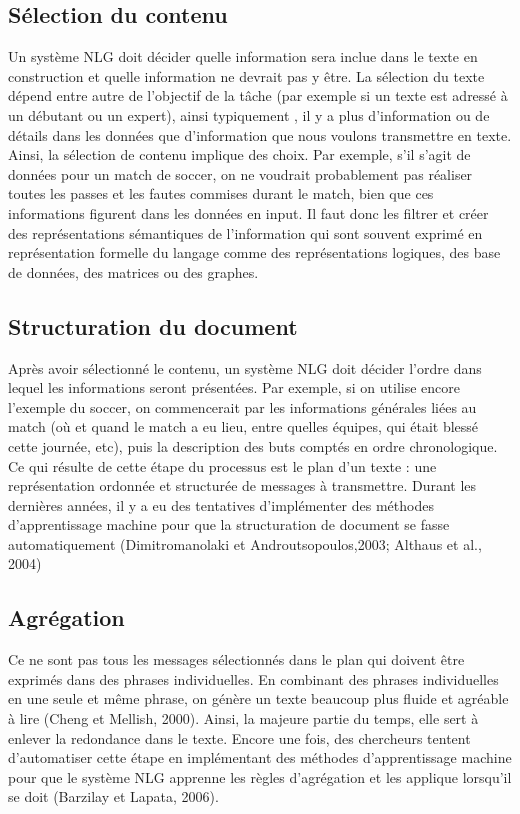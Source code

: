 \subsection{Sélection du contenu}

Un système NLG doit décider quelle information sera inclue dans le texte en construction et quelle information ne devrait pas y être. La sélection du texte dépend entre autre de l'objectif de la tâche (par exemple si un texte est adressé à un débutant ou un expert), ainsi typiquement , il y a plus d'information ou de détails dans les données que d'information que nous voulons transmettre en texte. Ainsi, la sélection de contenu implique des choix. Par exemple, s'il s'agit de données pour un match de soccer, on ne voudrait probablement pas réaliser toutes les passes et les fautes commises durant le match, bien que ces informations figurent dans les données en input. Il faut donc les filtrer et créer des représentations sémantiques de l'information qui sont souvent exprimé en représentation formelle du langage comme des représentations logiques, des base de données, des matrices ou des graphes.

\subsection{Structuration du document}
Après avoir sélectionné le contenu, un système NLG doit décider l'ordre dans lequel les informations seront présentées. Par exemple, si on utilise encore l'exemple du soccer, on commencerait par les informations générales liées au match (où et quand le match a eu lieu, entre quelles équipes, qui était blessé cette journée, etc), puis la description des buts comptés en ordre chronologique. Ce qui résulte de cette étape du processus est le plan d'un texte : une représentation ordonnée et structurée de messages à transmettre. Durant les dernières années, il y a eu des tentatives d'implémenter des méthodes d'apprentissage machine pour que la structuration de document se fasse automatiquement (Dimitromanolaki et Androutsopoulos,2003; Althaus et al., 2004)

\subsection{Agrégation}
Ce ne sont pas tous les messages sélectionnés dans le plan qui doivent être exprimés dans des phrases individuelles. En combinant des phrases individuelles en une seule et même phrase, on génère un texte beaucoup plus fluide et agréable à lire (Cheng et Mellish, 2000). Ainsi, la majeure partie du temps, elle sert à enlever la redondance dans le texte. Encore une fois, des chercheurs tentent d'automatiser cette étape en implémentant des méthodes d'apprentissage machine pour que le système NLG apprenne les règles d'agrégation et les applique lorsqu'il se doit (Barzilay et Lapata, 2006).

